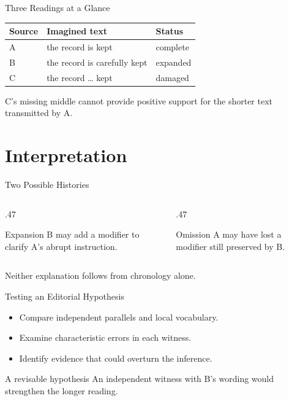 \documentclass{impebeamer}
\begin{document}
\begin{frame}{Three Readings at a Glance}
  \small
  \begin{table}
    \centering
    \begin{tabular}{lll}
      \toprule
      Source & Imagined text & Status \\
      \midrule
      A & the record is kept & complete \\
      B & the record is carefully kept & expanded \\
      C & the record \ldots{} kept & damaged \\
      \bottomrule
    \end{tabular}
  \end{table}
  \medskip
  C's missing middle cannot provide positive support
  for the shorter text transmitted by A.
\end{frame}

\section{Interpretation}
\begin{frame}{Two Possible Histories}
  \begin{columns}[T]
    \begin{column}{.47\textwidth}
      \begin{block}{Expansion}
        B may add a modifier to clarify
        A's abrupt instruction.
      \end{block}
    \end{column}
    \begin{column}{.47\textwidth}
      \begin{block}{Omission}
        A may have lost a modifier
        still preserved by B.
      \end{block}
    \end{column}
  \end{columns}
  \medskip
  Neither explanation follows from chronology alone.
\end{frame}

\begin{frame}{Testing an Editorial Hypothesis}
  \begin{itemize}
    \item Compare independent parallels and local vocabulary.
    \item Examine characteristic errors in each witness.
    \item Identify evidence that could overturn the inference.
  \end{itemize}
  \begin{exampleblock}{A revisable hypothesis}
    An independent witness with B's wording
    would strengthen the longer reading.
  \end{exampleblock}
\end{frame}
\end{document}
